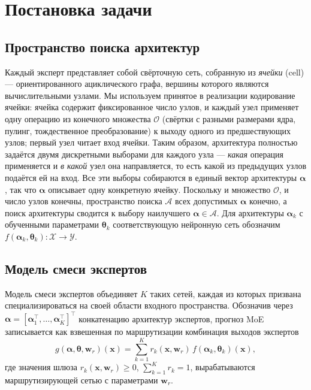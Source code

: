 \chapter{Постановка задачи}
\label{ch:problem}

\section{Пространство поиска архитектур}
\label{sec:searchspace}

Каждый эксперт представляет собой свёрточную сеть, собранную из
\emph{ячейки} (cell) --- ориентированного ациклического графа, вершины
которого являются вычислительными узлами. Мы используем принятое в
реализации кодирование ячейки: ячейка содержит фиксированное число
узлов, и каждый узел применяет одну операцию из конечного множества
$\mathcal{O}$ (свёртки с разными размерами ядра, пулинг, тождественное
преобразование) к выходу одного из предшествующих узлов; первый узел
читает вход ячейки. Таким образом, архитектура полностью задаётся двумя
дискретными выборами для каждого узла --- \emph{какая} операция
применяется и \emph{в какой} узел она направляется, то есть какой из
предыдущих узлов подаётся ей на вход. Все эти выборы собираются в единый
вектор архитектуры $\boldsymbol{\alpha}$, так что $\boldsymbol{\alpha}$
описывает одну конкретную ячейку. Поскольку и множество $\mathcal{O}$, и
число узлов конечны, пространство поиска $\mathcal{A}$ всех допустимых
$\boldsymbol{\alpha}$ конечно, а поиск архитектуры сводится к выбору
наилучшего $\boldsymbol{\alpha} \in \mathcal{A}$. Для архитектуры
$\boldsymbol{\alpha}_k$ с обученными параметрами $\boldsymbol{\theta}_k$
соответствующую нейронную сеть обозначим
$f(\boldsymbol{\alpha}_k, \boldsymbol{\theta}_k): \mathcal{X} \to \mathcal{Y}$.

\section{Модель смеси экспертов}
\label{sec:moe}

Модель смеси экспертов объединяет $K$ таких сетей, каждая из которых
призвана специализироваться на своей области входного пространства.
Обозначив через
$\boldsymbol{\alpha} = [\boldsymbol{\alpha}_1^{\!\top}, \ldots, \boldsymbol{\alpha}_K^{\!\top}]^{\!\top}$
конкатенацию архитектур экспертов, прогноз MoE записывается как
взвешенная по маршрутизации комбинация выходов экспертов
\begin{equation}
\label{eq:moe_pred}
g(\boldsymbol{\alpha}, \boldsymbol{\theta}, \boldsymbol{w}_r)(\boldsymbol{x})
= \sum_{k=1}^{K} r_k(\boldsymbol{x}, \boldsymbol{w}_r)\, f(\boldsymbol{\alpha}_k, \boldsymbol{\theta}_k)(\boldsymbol{x}),
\end{equation}
где значения шлюза $r_k(\boldsymbol{x}, \boldsymbol{w}_r) \geq 0$,
$\sum_{k=1}^{K} r_k = 1$, вырабатываются маршрутизирующей сетью с
параметрами $\boldsymbol{w}_r$.

